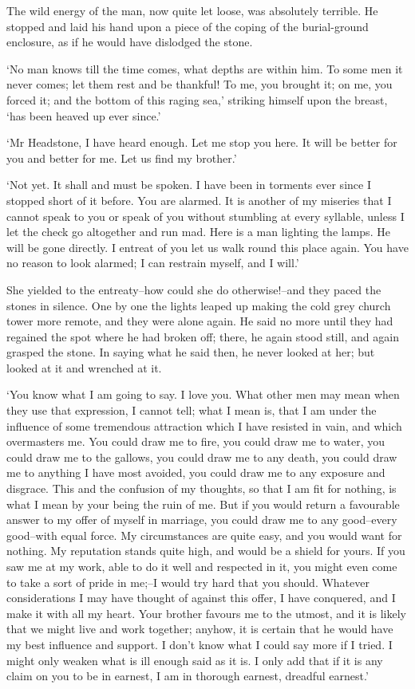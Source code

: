 The wild energy of the man, now quite let loose, was absolutely
terrible. He stopped and laid his hand upon a piece of the coping of the
burial-ground enclosure, as if he would have dislodged the stone.

‘No man knows till the time comes, what depths are within him. To some
men it never comes; let them rest and be thankful! To me, you brought
it; on me, you forced it; and the bottom of this raging sea,’ striking
himself upon the breast, ‘has been heaved up ever since.’

‘Mr Headstone, I have heard enough. Let me stop you here. It will be
better for you and better for me. Let us find my brother.’

‘Not yet. It shall and must be spoken. I have been in torments ever
since I stopped short of it before. You are alarmed. It is another of my
miseries that I cannot speak to you or speak of you without stumbling at
every syllable, unless I let the check go altogether and run mad. Here
is a man lighting the lamps. He will be gone directly. I entreat of you
let us walk round this place again. You have no reason to look alarmed;
I can restrain myself, and I will.’

She yielded to the entreaty--how could she do otherwise!--and they paced
the stones in silence. One by one the lights leaped up making the cold
grey church tower more remote, and they were alone again. He said no
more until they had regained the spot where he had broken off; there, he
again stood still, and again grasped the stone. In saying what he said
then, he never looked at her; but looked at it and wrenched at it.

‘You know what I am going to say. I love you. What other men may mean
when they use that expression, I cannot tell; what I mean is, that I am
under the influence of some tremendous attraction which I have resisted
in vain, and which overmasters me. You could draw me to fire, you could
draw me to water, you could draw me to the gallows, you could draw me to
any death, you could draw me to anything I have most avoided, you could
draw me to any exposure and disgrace. This and the confusion of my
thoughts, so that I am fit for nothing, is what I mean by your being the
ruin of me. But if you would return a favourable answer to my offer
of myself in marriage, you could draw me to any good--every good--with
equal force. My circumstances are quite easy, and you would want for
nothing. My reputation stands quite high, and would be a shield for
yours. If you saw me at my work, able to do it well and respected in
it, you might even come to take a sort of pride in me;--I would try hard
that you should. Whatever considerations I may have thought of against
this offer, I have conquered, and I make it with all my heart. Your
brother favours me to the utmost, and it is likely that we might live
and work together; anyhow, it is certain that he would have my best
influence and support. I don’t know what I could say more if I tried. I
might only weaken what is ill enough said as it is. I only add that
if it is any claim on you to be in earnest, I am in thorough earnest,
dreadful earnest.’

